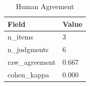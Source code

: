 \begin{table}[t]
\centering
\caption{Human Agreement}
\begin{tabular}{ll}
\toprule
Field & Value \\
\midrule
n\_items & 3 \\
n\_judgments & 6 \\
raw\_agreement & 0.667 \\
cohen\_kappa & 0.000 \\
\bottomrule
\end{tabular}
\end{table}
